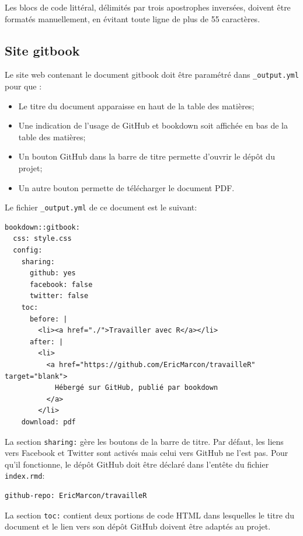 \documentclass[
  12pt,
  french,
  a4paper,
  extrafontsizes,onecolumn,openright
  ]{memoir}
\providecommand{\tightlist}{%
  \setlength{\itemsep}{0pt}\setlength{\parskip}{0pt}}
\begin{document}
Les blocs de code littéral, délimités par trois apostrophes inversées, doivent être formatés manuellement, en évitant toute ligne de plus de 55 caractères.

\hypertarget{site-gitbook}{%
\subsection{Site gitbook}\label{site-gitbook}}

Le site web contenant le document gitbook doit être paramétré dans \texttt{\_output.yml} pour que :

\begin{itemize}
\tightlist
\item
  Le titre du document apparaisse en haut de la table des matières;
\item
  Une indication de l'usage de GitHub et bookdown soit affichée en bas de la table des matières;
\item
  Un bouton GitHub dans la barre de titre permette d'ouvrir le dépôt du projet;
\item
  Un autre bouton permette de télécharger le document PDF.
\end{itemize}

Le fichier \texttt{\_output.yml} de ce document est le suivant:

\begin{verbatim}
bookdown::gitbook:
  css: style.css
  config:
    sharing:
      github: yes
      facebook: false
      twitter: false
    toc:
      before: |
        <li><a href="./">Travailler avec R</a></li>
      after: |
        <li>
          <a href="https://github.com/EricMarcon/travailleR" target="blank">
            Hébergé sur GitHub, publié par bookdown
          </a>
        </li>
    download: pdf
\end{verbatim}

La section \texttt{sharing:} gère les boutons de la barre de titre.
Par défaut, les liens vers Facebook et Twitter sont activés mais celui vers GitHub ne l'est pas.
Pour qu'il fonctionne, le dépôt GitHub doit être déclaré dans l'entête du fichier \texttt{index.rmd}:

\begin{verbatim}
github-repo: EricMarcon/travailleR
\end{verbatim}

La section \texttt{toc:} contient deux portions de code HTML dans lesquelles le titre du document et le lien vers son dépôt GitHub doivent être adaptés au projet.
\end{document}
